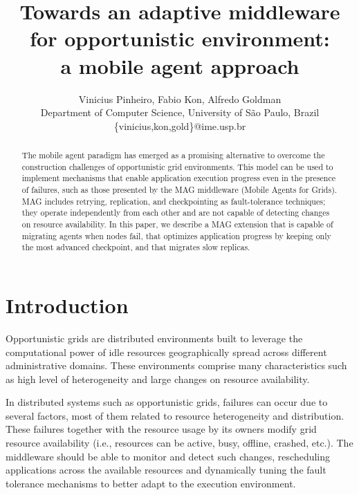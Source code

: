 \documentclass[times, 09pt, twocolumn]{article}
\begin{document}
\title{Towards an adaptive middleware for opportunistic environment:\\ a mobile agent approach}

\author{Vinicius Pinheiro, Fabio Kon, Alfredo Goldman\\
Department of Computer Science, University of S\~ao Paulo, Brazil\\
\{vinicius,kon,gold\}@ime.usp.br}

\maketitle
\thispagestyle{empty}

\begin{abstract}

The mobile agent paradigm has emerged as a promising alternative to overcome
the construction challenges of opportunistic grid environments.
This model can be used to implement mechanisms that enable
application execution progress even in the presence of failures, such as
those presented by the MAG middleware (Mobile Agents for Grids). 
MAG includes retrying, replication, and checkpointing as
fault-tolerance techniques; they operate independently from
each other and are not capable of detecting changes on resource availability.
In this paper, we describe a MAG extension that is capable of migrating agents when 
nodes fail, that optimizes application progress by keeping only the most advanced 
checkpoint, and that migrates slow replicas.
\end{abstract}


\section{Introduction}

Opportunistic grids are distributed environments built to leverage the
computational power of idle resources geographically spread across different
administrative domains. These environments comprise many characteristics such as
high level of heterogeneity and large changes on resource availability. 

In distributed systems such as opportunistic grids, failures can occur due to
several factors, most of them related to resource heterogeneity and
distribution. These failures together with the resource usage by its
owners modify grid resource availability (i.e.,
resources can be active, busy, offline, crashed, etc.). The middleware should
be able to monitor and detect such changes, rescheduling 
applications across the available resources and dynamically tuning the fault
tolerance mechanisms to better adapt to the execution environment. 
\end{document}
